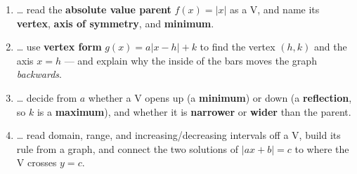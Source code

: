 \documentclass[10pt]{article}
\begin{document}

\vspace*{0.56in}
\namedateperiod
\vspace{0.12in}

\begin{learningtargetbox}
\small
\begin{enumerate}[leftmargin=1.5em, itemsep=5pt]
  \item \ldots{} read the \textbf{absolute value parent} $f(x)=|x|$ as a V, and name its
        \textbf{vertex}, \textbf{axis of symmetry}, and \textbf{minimum}.
  \item \ldots{} use \textbf{vertex form} $g(x)=a|x-h|+k$ to find the vertex $(h,k)$ and the axis
        $x=h$ --- and explain why the inside of the bars moves the graph \emph{backwards}.
  \item \ldots{} decide from $a$ whether a V opens up (a \textbf{minimum}) or down (a
        \textbf{reflection}, so $k$ is a \textbf{maximum}), and whether it is \textbf{narrower} or
        \textbf{wider} than the parent.
  \item \ldots{} read domain, range, and increasing/decreasing intervals off a V, build its rule
        from a graph, and connect the two solutions of $|ax+b|=c$ to where the V crosses $y=c$.
\end{enumerate}
\end{learningtargetbox}

\vspace{0.14in}
\end{document}
